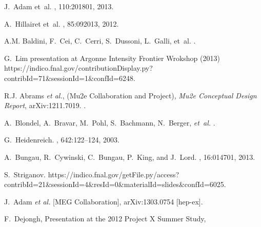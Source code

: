 \begin{thebibliography}{99}
J.~Adam et~al.
, 110:201801, 2013.

A.~Hillairet et~al.
, 85:092013, 2012.

A.M. Baldini, F.~Cei, C.~Cerri, S.~Dussoni, L.~Galli, et~al.
.

G.~Lim presentation at Argonne Intensity Frontier Wrokshop (2013) \hfill\break 
{\small https://indico.fnal.gov/contributionDisplay.py?contribId=71\&sessionId=1\&confId=6248}.

 R.J. Abrams {\it et al.}, (Mu2e Collaboration and Project), 
 {\it{Mu2e Conceptual Design Report}}, arXiv:1211.7019.
.

A.~Blondel, A.~Bravar, M.~Pohl, S.~Bachmann, N.~Berger, {\it et~al.}
.

G.~Heidenreich.
, 642:122--124, 2003.

A.~Bungau, R.~Cywinski, C.~Bungau, P.~King, and J.~Lord.
, 16:014701, 2013.

S.~Striganov.
{\small 
  https://indico.fnal.gov/getFile.py/access?contribId=21\&sessionId=4\&resId=0\&materialId=slides\&confId=6025.}


  J.~Adam {\it et al.}  [MEG Collaboration],
  arXiv:1303.0754 [hep-ex].
  
F.~Dejongh, Presentation at the 2012 Project X Summer Study, \hfill{}



\end{thebibliography}
